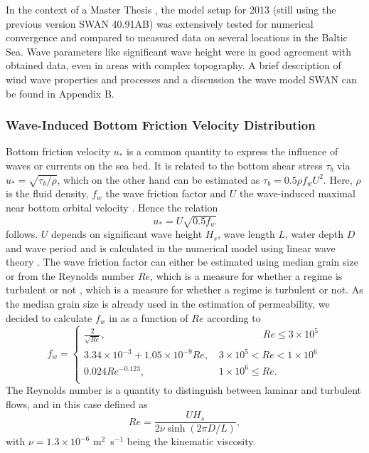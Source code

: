 In the context of a Master Thesis \citep[][]{masterarbeitronja}, the model 
setup for 2013 (still using the previous version SWAN 40.91AB) was 
extensively tested for numerical convergence and compared to measured data on 
several locations in the Baltic Sea. Wave parameters like significant wave 
height were in good agreement with obtained data, even in areas with complex 
topography. A brief description of wind wave properties and processes and a 
discussion the wave model SWAN can be found in Appendix B.

\subsubsection{Wave-Induced Bottom Friction Velocity Distribution}

Bottom friction velocity $u_\ast$ is a common quantity to express the influence 
of waves or currents on the sea bed. It is related to the bottom shear stress 
$\tau_b$ via $u_\ast = \sqrt{\tau_b \slash \rho}$, which on the other hand can 
be estimated as $\tau_b = 0.5 \rho f_w U^2$. Here, $\rho$ is the fluid 
density, $f_w$ the wave friction factor and $U$ the wave-induced
maximal near bottom orbital velocity \citep[][]{schwartz2006}. Hence the 
relation
\begin{equation}
 \label{ustar}
 u_\ast = U \sqrt{0.5 f_w}
\end{equation}
follows. $U$ depends on significant wave height $H_s$, wave length 
$L$, water depth $D$ and wave period and is calculated in the numerical 
model using linear wave theory \citep[][]{holthuijsen2007, schwartz2006}. The 
wave friction factor can either be estimated using median grain size 
\citep[][]{swart1974, nielsen1992} or from the Reynolds number $Re$, which is a 
measure for whether a regime is turbulent or not \citep[][, definition 
below]{nielsen1992, jonsson2004}, which is a measure for whether a regime is 
turbulent or not. As the median grain size is already used 
in the estimation of permeability, we decided to calculate $f_w$ in as a 
function of $Re$ according to
\begin{equation}
 \label{fw}
 f_w = \left\{ \begin{array}{lll}
             \frac{2}{\sqrt{Re}}, & \qquad \qquad \; \,  Re \leq 3 \times 10^5 
\\
              3.34 \times 10^{-3} + 1.05 \times 10^{-9} Re, \, &3 \times 10^5 < 
							  Re < 1 \times 10^6 \\
	      0.024 Re^{-0.123}, \, &1 \times 10^6 \leq Re. \\
              \end{array} 
              \right. 
\end{equation}
The Reynolds number is a quantity to distinguish between laminar and turbulent 
flows, and in this case defined as
\begin{equation}
 \label{reynolds}
 Re = \frac{U H_s}{2 \nu \sinh (2 \pi D \slash L) },
\end{equation}
with $\nu = 1.3 \times 10^{-6}$ m$^2$~s$^{-1}$ being the kinematic viscosity.

